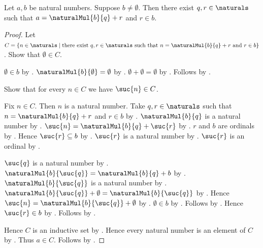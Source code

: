 \begin{theorem}\label{spike15_natural_division_algorithm}
    Let $a,b$ be natural numbers.
    Suppose $b\neq\emptyset$.
    Then there exist $q,r\in\naturals$ such that
        $a=\naturalMul{b}{q}+r$ and $r\in b$.
\end{theorem}
\begin{proof}
    Let $C=\{n\in\naturals\mid
        \text{there exist $q,r\in\naturals$ such that
            $n=\naturalMul{b}{q}+r$ and $r\in b$}\}$.
    Show that $\emptyset\in C$.
    \begin{subproof}
        $\emptyset\in b$ by .
        $\naturalMul{b}{\emptyset}=\emptyset$
            by .
        $\emptyset+\emptyset=\emptyset$
            by .
        Follows by .
    \end{subproof}
    Show that for every $n\in C$ we have $\suc{n}\in C$.
    \begin{subproof}
        Fix $n\in C$.
        Then $n$ is a natural number.
        Take $q,r\in\naturals$ such that
            $n=\naturalMul{b}{q}+r$ and $r\in b$ by \auto.
        $\naturalMul{b}{q}$ is a natural number
            by .
        $\suc{n}=\naturalMul{b}{q}+\suc{r}$
            by .
        $r$ and $b$ are ordinals by .
        Hence $\suc{r}\subseteq b$ by .
        $\suc{r}$ is a natural number by .
        $\suc{r}$ is an ordinal by .
        \begin{byCase}
                $\suc{q}$ is a natural number by .
                $\naturalMul{b}{\suc{q}}
                    =\naturalMul{b}{q}+b$
                    by .
                $\naturalMul{b}{\suc{q}}$ is a natural number
                    by .
                $\naturalMul{b}{\suc{q}}+\emptyset
                    =\naturalMul{b}{\suc{q}}$
                    by .
                Hence $\suc{n}=\naturalMul{b}{\suc{q}}+\emptyset$
                    by \auto.
                $\emptyset\in b$
                    by .
                Follows by .
                Hence $\suc{r}\in b$
                    by .
                Follows by .
        \end{byCase}
    \end{subproof}
    Hence $C$ is an inductive set by .
    Hence every natural number is an element of $C$
        by .
    Thus $a\in C$.
    Follows by \auto.
\end{proof}

